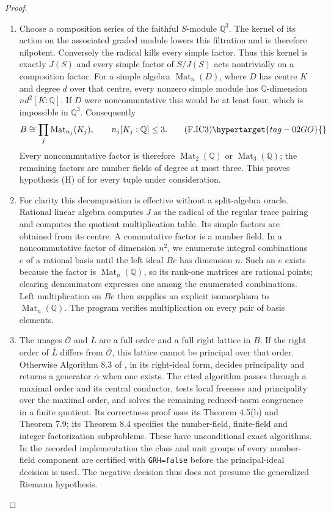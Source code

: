 \begin{proof}
\begin{enumerate}[label={$\langle1\rangle$\arabic*.}]
\item Choose a composition series of the faithful $S$-module $\mathbb Q^3$.
The kernel of its action on the associated graded module lowers this
filtration and is therefore nilpotent. Conversely the radical kills
every simple factor. Thus this kernel is exactly $J(S)$ and every
simple factor of $S/J(S)$ acts nontrivially on a composition factor.
For a simple algebra $\operatorname{Mat}_n(D)$, where $D$ has centre
$K$ and degree $d$ over that centre, every nonzero simple module has
$\mathbb Q$-dimension $n d^2[K:\mathbb Q]$. If $D$ were
noncommutative this would be at least four, which is impossible in
$\mathbb Q^3$. Consequently
\[
 B\cong\prod_j\operatorname{Mat}_{n_j}(K_j),\qquad
 n_j[K_j:\mathbb Q]\le3.                                    \tag{F.IC3}\hypertarget{tag-02GO}{}\label{maps:eq:F.IC3}
\]
Every noncommutative factor is therefore
$\operatorname{Mat}_2(\mathbb Q)$ or
$\operatorname{Mat}_3(\mathbb Q)$; the remaining factors are number
fields of degree at most three. This proves hypothesis (H) of
\cite[Algorithm 8.3, p.~21]{rootBHJ22} for every tuple under consideration.

\item For clarity this decomposition is effective without a split-algebra
oracle. Rational linear algebra computes $J$ as the radical of the
regular trace pairing and computes the quotient multiplication table.
Its simple factors are obtained from its centre. A commutative factor
is a number field. In a noncommutative factor of dimension $n^2$, we
enumerate integral combinations $e$ of a rational basis until the
left ideal $Be$ has dimension $n$. Such an $e$ exists because the
factor is $\operatorname{Mat}_n(\mathbb Q)$, so its rank-one matrices
are rational points; clearing denominators expresses one among the
enumerated combinations. Left multiplication on $Be$ then supplies
an explicit isomorphism to $\operatorname{Mat}_n(\mathbb Q)$.
The program verifies multiplication on every pair of basis elements.

\item The images $\overline{\mathcal O}$ and $\overline L$ are a full order
and a full right lattice in $B$. If the right order of
$\overline L$ differs from $\overline{\mathcal O}$, this lattice
cannot be principal over that order. Otherwise Algorithm 8.3 of
\cite[Algorithm 8.3 and its correctness proof, p.~21]{rootBHJ22}, in its right-ideal form, decides principality and
returns a generator $\overline\alpha$ when one exists. The cited
algorithm passes through a maximal order and its central conductor,
tests local freeness and principality over the maximal order, and
solves the remaining reduced-norm congruence in a finite quotient.
Its correctness proof uses its Theorem 4.5(b) and Theorem 7.9; its
Theorem 8.4 specifies the number-field, finite-field and integer
factorization subproblems. These have unconditional exact algorithms.
In the recorded implementation the class and unit groups of every
number-field component are certified with \texttt{GRH=false} before
the principal-ideal decision is used. The negative decision thus
does not presume the generalized Riemann hypothesis.


\end{enumerate}
\end{proof}
